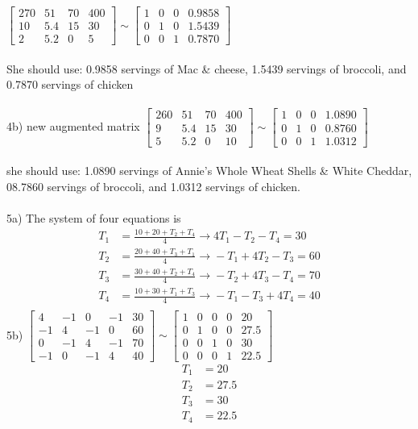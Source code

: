 \documentclass{article}
\begin{document}
 $\begin{bmatrix}
270 & 51 & 70 & 400 \\
10 & 5.4 & 15 & 30 \\
2 & 5.2 & 0 & 5 
\end{bmatrix}  \sim
\begin{bmatrix}
1 & 0 & 0 & 0.9858 \\
0 & 1 & 0 & 1.5439 \\ 
0 & 0 & 1 & 0.7870 
\end{bmatrix}  
$
\\
\\
She should use: 
    0.9858 servings of Mac \& cheese, 
    1.5439 servings of broccoli, 
    and 0.7870 servings of chicken 
    \\
    \\
4b) new augmented matrix
$ \begin{bmatrix}
260 & 51 & 70 & 400 \\
9 & 5.4 & 15 & 30 \\
5 & 5.2 & 0 & 10 
\end{bmatrix}  \sim
 \begin{bmatrix}
1 & 0 & 0 & 1.0890 \\
0 & 1 & 0 & 0.8760 \\
0 & 0 & 1 & 1.0312 
\end{bmatrix}  $
\\ 
\\
she should use: 
    1.0890 servings of Annie's Whole Wheat Shells \& White Cheddar,
    08.7860 servings of broccoli,
    and 1.0312 servings of chicken.
\\
\\
5a) The system of four equations is
\begin{align*}
    T_1 &= \frac{10 + 20 + T_2 + T_4}{4} \xrightarrow{} 4T_1 - T_2 - T_4 = 30\\
    T_2 &= \frac{20 + 40 + T_3 + T_1}{4} \xrightarrow{} -T_1 + 4T_2 - T_3 = 60\\
    T_3 &= \frac{30 + 40 + T_2 + T_4}{4} \xrightarrow{} -T_2 + 4T_3 - T_4 = 70\\
    T_4 &= \frac{10 + 30 + T_1 + T_3}{4} \xrightarrow{} -T_1 - T_3 + 4T_4  = 40\\
\end{align*}
5b)
$ \begin{bmatrix}
4 & -1 & 0 & -1 & 30 \\
-1 & 4 & -1 & 0 & 60 \\
0 & -1 & 4 & -1 & 70 \\
-1 & 0 & -1 & 4 & 40 
\end{bmatrix}  \sim
\begin{bmatrix}
1 & 0 & 0 & 0 & 20 \\
0 & 1 & 0 & 0 & 27.5 \\
0 & 0 & 1 & 0 & 30 \\
0 & 0 & 0 & 1 & 22.5 
\end{bmatrix}
$
\begin{align*}
    T_1 &= 20 \\
    T_2 &= 27.5 \\
    T_3 &= 30 \\
    T_4 &= 22.5 \\
\end{align*}
\end{document}
